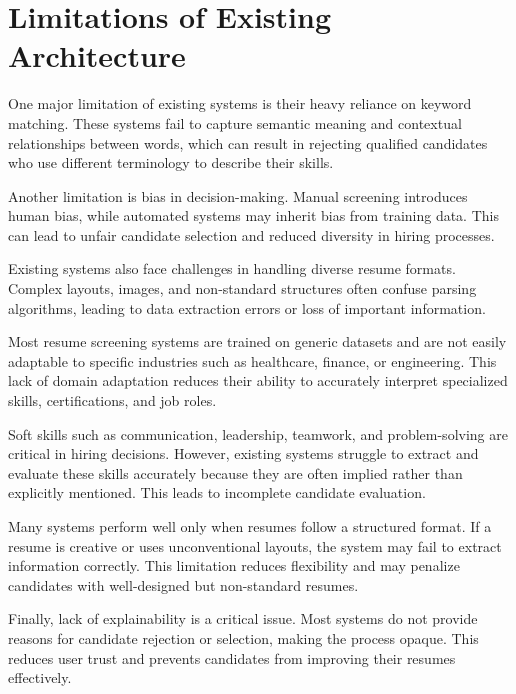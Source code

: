 \section{Limitations of Existing Architecture}


One major limitation of existing systems is their heavy reliance on keyword matching. These systems fail to capture semantic meaning and contextual relationships between words, which can result in rejecting qualified candidates who use different terminology to describe their skills.

\vspace{6pt}
{%
Another limitation is bias in decision-making. Manual screening introduces human bias, while automated systems may inherit bias from training data. This can lead to unfair candidate selection and reduced diversity in hiring processes.}


\vspace{6pt}
{%
Existing systems also face challenges in handling diverse resume formats. Complex layouts, images, and non-standard structures often confuse parsing algorithms, leading to data extraction errors or loss of important information.}

\vspace{6pt}
{%
Most resume screening systems are trained on generic datasets and are not easily adaptable to specific industries such as healthcare, finance, or engineering. This lack of domain adaptation reduces their ability to accurately interpret specialized skills, certifications, and job roles.}

\vspace{6pt}
{%
Soft skills such as communication, leadership, teamwork, and problem-solving are critical in hiring decisions. However, existing systems struggle to extract and evaluate these skills accurately because they are often implied rather than explicitly mentioned. This leads to incomplete candidate evaluation.}

\vspace{6pt}
{%
Many systems perform well only when resumes follow a structured format. If a resume is creative or uses unconventional layouts, the system may fail to extract information correctly. This limitation reduces flexibility and may penalize candidates with well-designed but non-standard resumes.}


\vspace{6pt}
{%
\noindent Finally, lack of explainability is a critical issue. Most systems do not provide reasons for candidate rejection or selection, making the process opaque. This reduces user trust and prevents candidates from improving their resumes effectively.}




